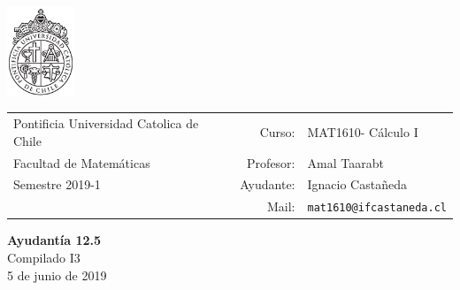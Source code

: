 \documentclass[12pt]{article}
\makeatletter
\newcommand{\ayudantia}{{\sc Ayudantía 12.5}}
\newcommand{\tituloayu}{Compilado I3}
\newcommand{\fecha}{5 de junio de 2019}
\newcommand{\sigla}{MAT1610}
\newcommand{\nombre}{Cálculo I}
\newcommand{\profesor}{Amal Taarabt}
\newcommand{\ano}{2019}
\newcommand{\semestre}{1}
\newcommand{\mail}{mat1610@ifcastaneda.cl}
\makeatother
\begin{document}
\thispagestyle{empty}

\begin{minipage}{2cm}
	\includegraphics[width=2cm]{../../../../img/logo.pdf}
	\vspace{0.5cm}
\end{minipage}
\begin{minipage}{\linewidth}
	\begin{tabular}{lrl}
		{\scriptsize\sc Pontificia Universidad Catolica de Chile} & \hspace*{0.7in}Curso: &
		\sigla  - \nombre\\
		{\sc Facultad de Matemáticas}&
		Profesor: & \profesor \\
		{\sc Semestre \ano-\semestre} & Ayudante: & {Ignacio Castañeda}\\
		& {Mail:} & \texttt{\mail}
	\end{tabular}
\end{minipage}

\vspace{-10mm}
\begin{center}
	{\LARGE\bf \ayudantia}\\
	\vspace{0.1cm}
	{\tituloayu}\\
	\vspace{0.1cm}
	\fecha\\
	\vspace{0.4cm}
\end{center}
\end{document}
